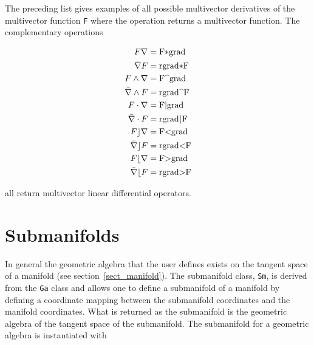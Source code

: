 \documentclass[12pt]{report}
\newcommand{\W}{\wedge}
\newcommand{\T}[1]{\texttt{#1}}
\begin{document}
The preceding list gives examples of all possible multivector
derivatives of the multivector function \T{F} where the operation returns
a multivector function. The complementary operations

      \begin{align*}
            F \nabla &=  \mbox{\lstinline!F*grad!} \\
            \bar{\nabla} F &=  \mbox{\lstinline!rgrad*F!} \\
            F \W \nabla &=  \mbox{\lstinline!F^grad!} \\
            \bar{\nabla} \W F &=  \mbox{\lstinline!rgrad^F!} \\
            F \cdot \nabla &=  \mbox{\lstinline!F|grad!} \\
            \bar{\nabla}\cdot F &=  \mbox{\lstinline!rgrad|F!} \\
            F \rfloor \nabla &=  \mbox{\lstinline!F<grad!} \\
            \bar{\nabla} \rfloor F &=  \mbox{\lstinline!rgrad<F!} \\
            F \lfloor \nabla &=  \mbox{\lstinline!F>grad!} \\
            \bar{\nabla} \lfloor F &= \mbox{\lstinline!rgrad>F!}
      \end{align*}

all return multivector linear differential operators.

\section{Submanifolds}

In general the geometric algebra that the user defines exists on the tangent space of
a manifold (see section~\ref{sect_manifold}).  The submanifold class, \T{Sm}, is derived from
the \T{Ga} class and allows one
to define a submanifold of a manifold by defining a coordinate mapping between the submanifold
coordinates and the manifold coordinates.  What is returned as the submanifold is the geometric
algebra of the tangent space of the submanifold. The submanifold for a geometric algebra is
instantiated with
\end{document}
